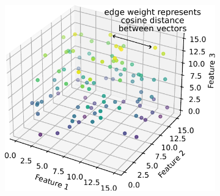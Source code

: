 \begin{figure}
  \centering
  \begin{subfigure}[t]{0.5\textwidth}
  \centering
    \includegraphics[width=\linewidth]{graph_representation}
    \caption{
    }
    \label{fig:analysis-clustering-modclust-graph}
  \end{subfigure}


\end{figure}
